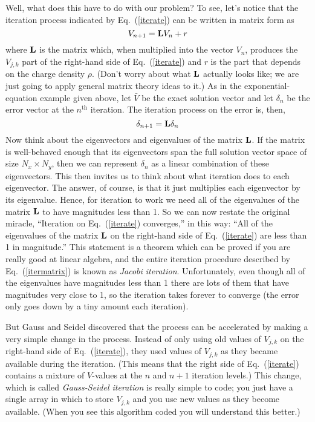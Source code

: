 Well, what does this have to do with our problem? To see, let's
notice that the iteration process indicated by Eq.~(\ref{iterate})
can be written in matrix form as
\begin{equation}
    V_{n+1} = {\bf L} V_n +r
    \label{itermatrix}
\end{equation}
where ${\bf L}$ is the matrix which, when multiplied into the vector
$V_n$, produces the $V_{j,k}$ part of the right-hand side of
Eq.~(\ref{iterate}) and $r$ is the part that depends on the charge
density $\rho$. (Don't worry about what ${\bf L}$ actually looks
like; we are just going to apply general matrix theory ideas to it.)
As in the exponential-equation example given above, let $\bar{V}$ be
the exact solution vector and let $\delta_n$ be the error vector at
the $n^\mathrm{th}$ iteration. The iteration process on the error is, then,
\begin{equation}
    \delta_{n+1} = {\bf L} \delta_n
\end{equation}
Now think about the eigenvectors and eigenvalues of the matrix
${\bf L}$. If the matrix is well-behaved enough that its
eigenvectors span the full solution vector space of size $N_x
\times N_y$, then we can represent $\delta_n$ as a linear
combination of these eigenvectors. This then invites us to
think about what iteration does to each eigenvector. The
answer, of course, is that it just multiplies each eigenvector
by its eigenvalue. Hence, for iteration to work we need all of
the eigenvalues of the matrix ${\bf L}$ to have magnitudes less
than 1. So we can now restate the original miracle, ``Iteration
on Eq.~(\ref{iterate}) converges,'' in this way: ``All of the
eigenvalues of the matrix ${\bf L}$ on the right-hand side of
Eq.~(\ref{iterate}) are less than 1 in magnitude.'' This
statement is a theorem which can be proved if you are really
good at linear algebra, and the entire iteration procedure
described by Eq.~(\ref{itermatrix}) is known as {\it Jacobi
iteration}.  
Unfortunately, even though all of the eigenvalues have
magnitudes less than 1 there are lots of them that have
magnitudes very close to 1, so the iteration takes forever to
converge (the error only goes down by a tiny amount each
iteration).


 

But Gauss and Seidel discovered that the process can be
accelerated by making a very simple change in the process.
Instead of only using old values of $V_{j,k}$ on the right-hand
side of Eq.~(\ref{iterate}), they used values of $V_{j,k}$ as
they became available during the iteration. (This means that
the right side of Eq.~(\ref{iterate}) contains a mixture of
$V$-values at the $n$ and $n+1$ iteration levels.) This change,
which is called {\it Gauss-Seidel iteration} is really simple
to code; you just have a single array in which to store
$V_{j,k}$ and you use new values as they become available.
(When you see this algorithm coded you will understand this
better.)

